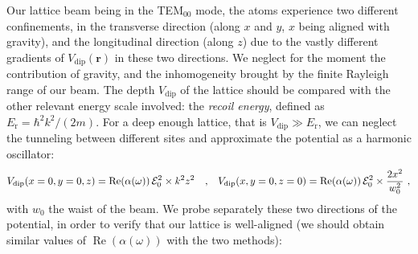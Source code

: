 \documentclass[11pt]{article}
\numberwithin{equation}{section}
\numberwithin{figure}{section}
\begin{document}
Our lattice beam being in the TEM$_{00}$ mode, the atoms experience two different confinements, in the transverse direction (along $x$ and $y$, $x$ being aligned with gravity), and the longitudinal direction (along $z$) due to the vastly different gradients of $V_\text{dip}(\mathbf{r})$ in these two directions. We neglect for the moment the contribution of gravity, and the inhomogeneity brought by the finite Rayleigh range of our beam. 
The depth $V_\text{dip}$ of the lattice should be compared with the other relevant energy scale involved: the \emph{recoil energy}, defined as $E_\text{r} = \hbar^2 k^2 / (2 m)$. For a deep enough lattice, that is $V_\text{dip} \gg E_\text{r}$, we can neglect the tunneling between different sites and approximate the potential as a harmonic oscillator:
%
\begin{equation}
	V_\text{dip} (x=0, y=0, z) = \operatorname{Re}(\alpha(\omega))\, \mathcal{E}_0^2 \times k^2 z^2 \qq{,} V_\text{dip} (x, y=0, z=0) = \operatorname{Re}(\alpha(\omega))\, \mathcal{E}_0^2 \times \frac{2 x^2}{w_0^2} ~,
\end{equation}
%
with $w_0$ the waist of the beam. We probe separately these two directions of the potential, in order to verify that our lattice is well-aligned (we should obtain similar values of $\operatorname{Re}(\alpha(\omega))$ with the two methods):
%
\end{document}
